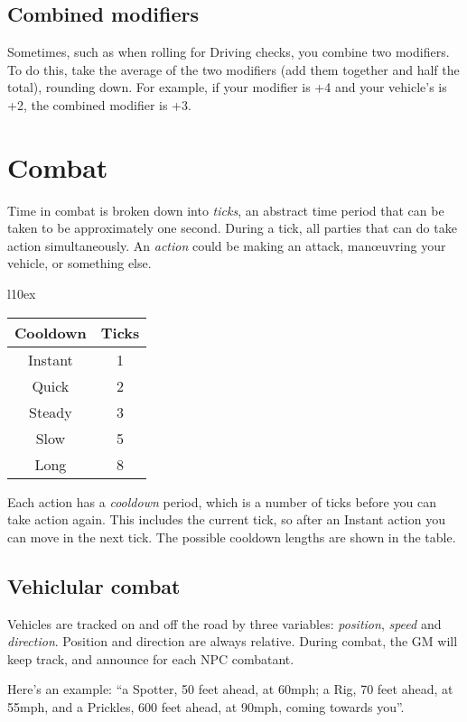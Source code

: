 \documentclass[10pt, a4paper, twocolumn]{article}
\begin{document}
\subsection{Combined modifiers}
Sometimes, such as when rolling for Driving checks, you combine two
modifiers. To do this, take the average of the two modifiers (add them
together and half the total), rounding down. For example, if your 
modifier is +4 and your vehicle's  is +2, the combined modifier
is +3.

\section{Combat}
Time in combat is broken down into \emph{ticks}, an abstract time period that
can be taken to be approximately one second. During a tick, all parties that
can do take action simultaneously. An \emph{action} could be making an attack,
man\oe{}uvring your vehicle, or something else.

\begin{wraptable}[6]{l}{10ex}
  \small
\vspace*{-3.5ex}
\hspace*{-4ex}
\begin{tabular}{cc}
  Cooldown & Ticks \\
  \hline 
  Instant  & 1     \\
  Quick    & 2     \\
  Steady   & 3     \\
  Slow     & 5     \\
  Long     & 8
\end{tabular}
\end{wraptable}

Each action has a \emph{cooldown} period, which is a number of ticks before you
can take action again. This includes the current tick, so after an Instant
action you can move in the next tick. The possible cooldown lengths are shown in
the table. 

\subsection{Vehiclular combat}
Vehicles are tracked on and off the road by three variables: \emph{position},
\emph{speed} and \emph{direction}. Position and direction are always relative.
During combat, the GM will keep track, and announce for each NPC combatant.

Here's an example: ``a Spotter, 50 feet ahead, at 60mph; a Rig, 70 feet ahead,
at 55mph, and a Prickles, 600 feet ahead, at 90mph, coming towards you''.
\end{document}
